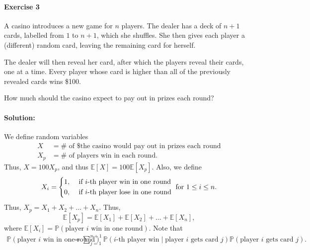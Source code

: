 \documentclass[a4paper,12pt]{article}
\begin{document}
\newpage

\paragraph{Exercise 3}  A casino introduces a new game for $n$ players. The dealer has a deck of $n+1$ cards, labelled from $1$ to $n+1$, which she shuffles. She then gives each player a (different) random card, leaving the remaining card for herself.

The dealer will then reveal her card, after which the players reveal their cards, one at a time. Every player whose card is higher than all of the previously revealed cards wins \$100.

How much should the casino expect to pay out in prizes each round?

\paragraph{Solution:} We define random variables 
\begin{align*}
	X &= \# \text{ of \$ the casino would pay out in prizes each round} \\
	X_p &= \# \text{ of players win in each round}.
\end{align*}
Thus, \(X = 100X_p\), and thus \(\mathbb{E} [X] = 100 \mathbb{E} [X_p]\). Also, we define 
\[
	X_i = \begin{dcases}
		1, &\text{ if } i\text{-th player win in one round} \\
		0, &\text{ if } i\text{-th player lose in one round}
	\end{dcases} \text{ for } 1 \le i \le n. 
\] 
Thus, \(X_p = X_1 + X_2 + \dots + X_n\). Thus,
\[
	\mathbb{E} [X_p] = \mathbb{E} [X_1] + \mathbb{E} [X_2] + \dots + \mathbb{E} [X_n],
\] 
where \(\mathbb{E} [X_i] = \mathbb{P} \left( \text{player } i \text{ win in one round}   \right) \). Note that 
\begin{align*}
	\mathbb{P} (\text{player } i \text{ win in one round}) &= \sum_{j=1}^{n+1} \mathbb{P} \left( i\text{-th player win} \mid \text{player } i \text{ gets card }j     \right) \mathbb{P} \left( \text{player } i \text{ gets card } j   \right).  
\end{align*} 
\end{document}
